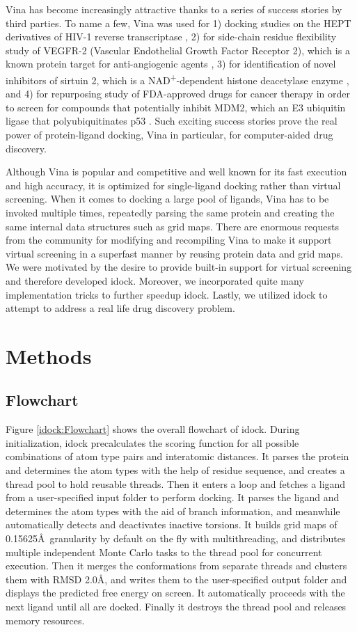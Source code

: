 Vina has become increasingly attractive thanks to a series of success stories by third parties. To name a few, Vina was used for 1) docking studies on the HEPT derivatives of HIV-1 reverse transcriptase \citep{843}, 2) for side-chain residue flexibility study of VEGFR-2 (Vascular Endothelial Growth Factor Receptor 2), which is a known protein target for anti-angiogenic agents \citep{1084}, 3) for identification of novel inhibitors of sirtuin 2, which is a NAD\textsuperscript{+}-dependent histone deacetylase enzyme \citep{1177}, and 4) for repurposing study of FDA-approved drugs for cancer therapy in order to screen for compounds that potentially inhibit MDM2, which an E3 ubiquitin ligase that polyubiquitinates p53 \citep{1230}. Such exciting success stories prove the real power of protein-ligand docking, Vina in particular, for computer-aided drug discovery.

Although Vina is popular and competitive and well known for its fast execution and high accuracy, it is optimized for single-ligand docking rather than virtual screening. When it comes to docking a large pool of ligands, Vina has to be invoked multiple times, repeatedly parsing the same protein and creating the same internal data structures such as grid maps. There are enormous requests from the community for modifying and recompiling Vina to make it support virtual screening in a superfast manner by reusing protein data and grid maps. We were motivated by the desire to provide built-in support for virtual screening and therefore developed idock. Moreover, we incorporated quite many implementation tricks to further speedup idock. Lastly, we utilized idock to attempt to address a real life drug discovery problem.

\section{Methods}

\subsection{Flowchart}

Figure \ref{idock:Flowchart} shows the overall flowchart of idock. During initialization, idock precalculates the scoring function for all possible combinations of atom type pairs and interatomic distances. It parses the protein and determines the atom types with the help of residue sequence, and creates a thread pool to hold reusable threads. Then it enters a loop and fetches a ligand from a user-specified input folder to perform docking. It parses the ligand and determines the atom types with the aid of branch information, and meanwhile automatically detects and deactivates inactive torsions. It builds grid maps of 0.15625\AA\ granularity by default on the fly with multithreading, and distributes multiple independent Monte Carlo tasks to the thread pool for concurrent execution. Then it merges the conformations from separate threads and clusters them with RMSD 2.0\AA, and writes them to the user-specified output folder and displays the predicted free energy on screen. It automatically proceeds with the next ligand until all are docked. Finally it destroys the thread pool and releases memory resources.

